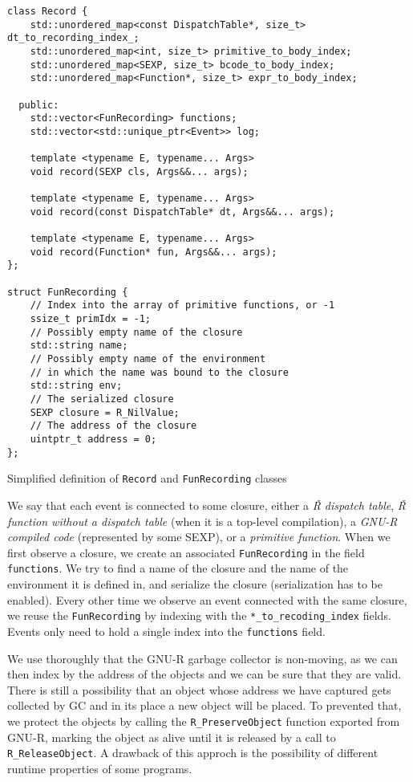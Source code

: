 \begin{listing}
	\begin{verbatim}
class Record {
    std::unordered_map<const DispatchTable*, size_t> dt_to_recording_index_;
    std::unordered_map<int, size_t> primitive_to_body_index;
    std::unordered_map<SEXP, size_t> bcode_to_body_index;
    std::unordered_map<Function*, size_t> expr_to_body_index;

  public:
    std::vector<FunRecording> functions;
    std::vector<std::unique_ptr<Event>> log;

    template <typename E, typename... Args>
    void record(SEXP cls, Args&&... args);

    template <typename E, typename... Args>
    void record(const DispatchTable* dt, Args&&... args);

    template <typename E, typename... Args>
    void record(Function* fun, Args&&... args);
};

struct FunRecording {
    // Index into the array of primitive functions, or -1
    ssize_t primIdx = -1;
    // Possibly empty name of the closure
    std::string name;
    // Possibly empty name of the environment
    // in which the name was bound to the closure
    std::string env;
    // The serialized closure
    SEXP closure = R_NilValue;
    // The address of the closure
    uintptr_t address = 0;
};
  \end{verbatim}
	\caption{Simplified definition of \texttt{Record} and \texttt{FunRecording} classes}\label{lst:record-class}
\end{listing}

We say that each event is connected to some closure, either a \textit{Ř dispatch table}, \textit{Ř function without a dispatch table} (when it is a top-level compilation), a \textit{GNU-R compiled code} (represented by some SEXP), or a \textit{primitive function}. When we first observe a closure, we create an associated \texttt{FunRecording} in the field \texttt{functions}. We try to find a name of the closure and the name of the environment it is defined in, and serialize the closure (serialization has to be enabled). Every other time we observe an event connected with the same closure, we reuse the \texttt{FunRecording} by indexing with the \texttt{*\_to\_recoding\_index} fields. Events only need to hold a single index into the \texttt{functions} field.

We use thoroughly that the GNU-R garbage collector is non-moving, as we can then index by the address of the objects and we can be sure that they are valid. There is still a possibility that an object whose address we have captured gets collected by GC and in its place a new object will be placed. To prevented that, we protect the objects by calling the \texttt{R\_PreserveObject} function exported from GNU-R, marking the object as alive until it is released by a call to \texttt{R\_ReleaseObject}. A drawback of this approch is the possibility of different runtime properties of some programs.

